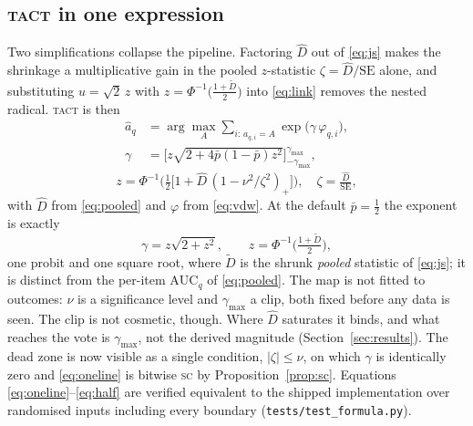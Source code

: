 \documentclass{article}
\newcommand{\Dhat}{\widehat{D}}
\newcommand{\SC}{\textsc{sc}}
\newcommand{\TACT}{\textsc{tact}}
\begin{document}
\subsection{\TACT{} in one expression}\label{sec:oneline}
Two simplifications collapse the pipeline. Factoring $\Dhat$ out of
\eqref{eq:js} makes the shrinkage a multiplicative gain in the pooled
$z$-statistic $\zeta=\Dhat/\mathrm{SE}$ alone, and substituting
$u=\sqrt2\,z$ with $z=\Phi^{-1}\!\big(\tfrac{1+\tilde D}{2}\big)$ into
\eqref{eq:link} removes the nested radical. \TACT{} is then
\begin{equation}\label{eq:oneline}
\boxed{\;
\begin{aligned}
\hat a_q&=\arg\max_A \sum_{i:\,a_{q,i}=A}\exp\big(\gamma\,\varphi_{q,i}\big),\\[2pt]
\gamma&=\Big[z\sqrt{2+4\bar p(1-\bar p)z^{2}}\Big]_{-\gamma_{\max}}^{\gamma_{\max}},
\end{aligned}
\;}
\end{equation}
\begin{equation}\label{eq:oneline2}
z=\Phi^{-1}\!\Big(\tfrac12\big[1+\Dhat\,(1-\nu^{2}/\zeta^{2})_{+}\big]\Big),
\quad \zeta=\tfrac{\Dhat}{\mathrm{SE}},
\end{equation}
with $\Dhat$ from \eqref{eq:pooled} and $\varphi$ from \eqref{eq:vdw}. At the
default $\bar p=\tfrac12$ the exponent is exactly
\begin{equation}\label{eq:half}
\gamma=z\sqrt{2+z^{2}},\qquad z=\Phi^{-1}\!\big(\tfrac{1+\tilde D}{2}\big),
\end{equation}
one probit and one square root, where $\tilde D$ is the shrunk \emph{pooled}
statistic of \eqref{eq:js}; it is distinct from the per-item
$\mathrm{AUC}_q$ of \eqref{eq:pooled}. The map is not fitted to outcomes:
$\nu$ is a
significance level and $\gamma_{\max}$ a clip, both fixed before any data is
seen. The clip is not cosmetic, though. Where $\Dhat$ saturates it binds, and
what reaches the vote is $\gamma_{\max}$, not the derived magnitude
(Section~\ref{sec:results}). The dead zone is now visible as a single condition,
$|\zeta|\le\nu$, on which $\gamma$ is identically zero and \eqref{eq:oneline}
is bitwise \SC{} by Proposition~\ref{prop:sc}. Equations
\eqref{eq:oneline}--\eqref{eq:half} are verified equivalent to the shipped
implementation over randomised inputs including every boundary
(\texttt{tests/test\_formula.py}).
\end{document}
